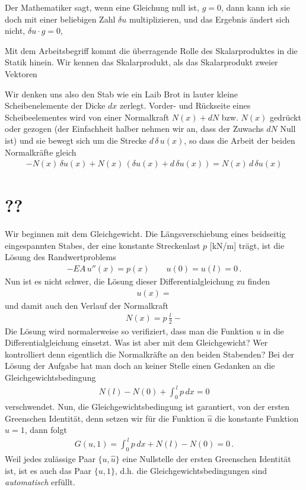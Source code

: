  Der Mathematiker sagt, wenn eine Gleichung null ist, $g = 0$, dann kann ich sie doch mit einer beliebigen Zahl $\delta u$ multiplizieren, und das Ergebnis \"{a}ndert sich nicht, $\delta u \cdot g = 0$,

 Mit dem Arbeitsbegriff kommt die \"{u}berragende Rolle des Skalarproduktes in die Statik hinein. Wir kennen das Skalarprodukt, als das Skalarprodukt zweier Vektoren

 Wir denken uns also den Stab wie ein Laib Brot in lauter kleine Scheibenelemente der Dicke $ dx $ zerlegt. Vorder- und R\"{u}ckseite eines Scheibeelementes wird von einer Normalkraft $N(x) + dN$ bzw. $ N (x)$ gedr\"{u}ckt oder gezogen (der Einfachheit halber nehmen wir an, dass der Zuwachs $ dN $ Null ist) und sie bewegt sich um die Strecke $d\,\delta\,u(x)$, so dass die Arbeit der beiden Normalkr\"{a}fte gleich
\begin{align}
- N(x)\,\delta u(x) + N(x) \,(\delta u(x) + d\, \delta u(x))  = N(x)\,d\,\delta u(x)
\end{align}

\section{??}
Wir beginnen mit dem Gleichgewicht. Die L\"{a}ngsverschiebung eines beidseitig eingespannten Stabes, der eine konstante Streckenlast $p$ [kN/m] tr\"{a}gt, ist die L\"{o}sung des Randwertproblems
\begin{align}
- EA\,u''(x) = p(x) \qquad u(0) = u(l) = 0\,.
\end{align}
Nun ist es nicht schwer, die L\"{o}sung dieser Differentialgleichung zu finden
\begin{align}
u(x) =
\end{align}
 und damit auch den Verlauf der Normalkraft
 \begin{align}
 N(x) = p\,\frac{l}{2} -
 \end{align}
Die L\"{o}sung wird normalerweise so verifiziert, dass man die Funktion $u$ in die Differentialgleichung einsetzt. Was ist aber mit dem Gleichgewicht? Wer kontrolliert denn eigentlich die Normalkr\"{a}fte an den beiden Stabenden? Bei der L\"{o}sung der Aufgabe hat man doch an keiner Stelle einen Gedanken an die Gleichgewichtsbedingung
\begin{align}
N(l) - N(0) + \int_0^{\,l} p\,dx = 0
\end{align}
verschwendet. Nun, die Gleichgewichtsbedingung ist garantiert, von der ersten Greenschen Identit\"{a}t, denn setzen wir f\"{u}r die Funktion $\hat{u}$ die konstante Funktion $\hat{u} = 1$, dann folgt
\begin{align}
G(u,1) = \int_0^{\,l} p\,dx + N(l) - N(0) = 0\,.
\end{align}
Weil jedes zul\"{a}ssige Paar $\{u, \hat{u}\}$ eine Nullstelle der ersten Greenschen Identit\"{a}t ist, ist es auch das Paar $\{u, 1\}$, d.h. die Gleichgewichtsbedingungen sind {\em automatisch\/} erf\"{u}llt.\\

